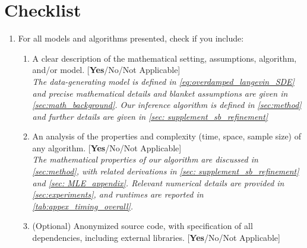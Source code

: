 \documentclass[twoside]{article}
\begin{document}
\section*{Checklist}

\begin{enumerate}

  \item For all models and algorithms presented, check if you include:
  \begin{enumerate}
    \item A clear description of the mathematical setting, assumptions, algorithm, and/or model. [\textbf{Yes}/No/Not Applicable]\\
    \textit{The data-generating model is defined in \eqref{eq:overdamped_langevin_SDE} and precise mathematical details and blanket assumptions are given in \cref{sec:math_background}. Our inference algorithm is defined in \cref{sec:method} and further details are given in \cref{sec: supplement_sb_refinement}}
    \item An analysis of the properties and complexity (time, space, sample size) of any algorithm. [\textbf{Yes}/No/Not Applicable]\\
    \textit{The mathematical properties of our algorithm are discussed in \cref{sec:method}, with related derivations in \cref{sec: supplement_sb_refinement} and \cref{sec: MLE_appendix}. Relevant numerical details are provided in \cref{sec:experiments}, and runtimes are reported in \cref{tab:appex_timing_overall}.}
    \item (Optional) Anonymized source code, with specification of all dependencies, including external libraries. [\textbf{Yes}/No/Not Applicable]
  \end{enumerate}


\end{enumerate}
\end{document}
